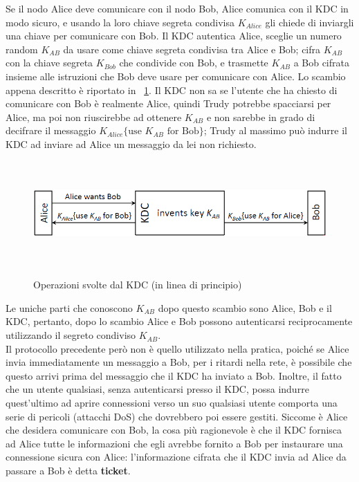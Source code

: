 Se il nodo Alice deve comunicare con il nodo Bob, Alice comunica con il KDC in modo sicuro, e usando la loro chiave segreta condivisa $K_{Alice}$ gli chiede di inviargli una chiave per comunicare con Bob. Il KDC autentica Alice, sceglie un numero random $K_{AB}$ da usare come chiave segreta condivisa tra Alice e Bob; cifra $K_{AB}$ con la chiave segreta $K_{Bob}$ che condivide con Bob, e trasmette $K_{AB}$ a Bob cifrata insieme alle istruzioni che Bob deve usare per comunicare con Alice. Lo scambio appena descritto è riportato in \figurename~\ref{fig:ImgS94bis}. Il KDC non sa se l'utente che ha chiesto di comunicare con Bob è realmente Alice, quindi Trudy potrebbe spacciarsi per Alice, ma poi non riuscirebbe ad ottenere $K_{AB}$ e non sarebbe in grado di decifrare il messaggio $K_{Alice}\lbrace \text{use } K_{AB} \text{ for Bob} \rbrace$; Trudy al massimo può indurre il KDC ad inviare ad Alice un messaggio da lei non richiesto.
\begin{figure}[htbp]
	\centering%
	\subfigure%
	{\includegraphics[height=4cm, width=12cm, keepaspectratio]{Immagini/autenticazione/ImgS94bis.png}}
	\caption{Operazioni svolte dal KDC (in linea di principio)}\label{fig:ImgS94bis} 	
\end{figure}
Le uniche parti che conoscono $K_{AB}$ dopo questo scambio sono Alice, Bob e il KDC, pertanto, dopo lo scambio Alice e Bob possono autenticarsi reciprocamente utilizzando il segreto condiviso $K_{AB}$. \\
Il protocollo precedente però non è quello utilizzato nella pratica, poiché se Alice invia immediatamente un messaggio a Bob, per i ritardi nella rete, è possibile che questo arrivi prima del messaggio che il KDC ha inviato a Bob. Inoltre, il fatto che un utente qualsiasi, senza autenticarsi presso il KDC, possa indurre quest'ultimo ad aprire connessioni verso un suo qualsiasi utente comporta una serie di pericoli (attacchi DoS) che dovrebbero poi essere gestiti. Siccome è Alice che desidera comunicare con Bob, la cosa più ragionevole è che il KDC fornisca ad Alice tutte le informazioni che egli avrebbe fornito a Bob per instaurare una connessione sicura con Alice: l'informazione cifrata che il KDC invia ad Alice da passare a Bob è detta \textbf{ticket}.
